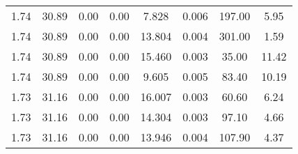 \begin{table}
\begin{tabular}{S S S S S S S S }
1.74  & 30.89  & 0.00  & 0.00  & 7.828  & 0.006  & 197.00  & 5.95\\ 
1.74  & 30.89  & 0.00  & 0.00  & 13.804  & 0.004  & 301.00  & 1.59\\ 
1.74  & 30.89  & 0.00  & 0.00  & 15.460  & 0.003  & 35.00  & 11.42\\ 
1.74  & 30.89  & 0.00  & 0.00  & 9.605  & 0.005  & 83.40  & 10.19\\ 
1.73  & 31.16  & 0.00  & 0.00  & 16.007  & 0.003  & 60.60  & 6.24\\ 
1.73  & 31.16  & 0.00  & 0.00  & 14.304  & 0.003  & 97.10  & 4.66\\ 
1.73  & 31.16  & 0.00  & 0.00  & 13.946  & 0.004  & 107.90  & 4.37\\ 
\bottomrule 
\end{tabular} 
\end{table}